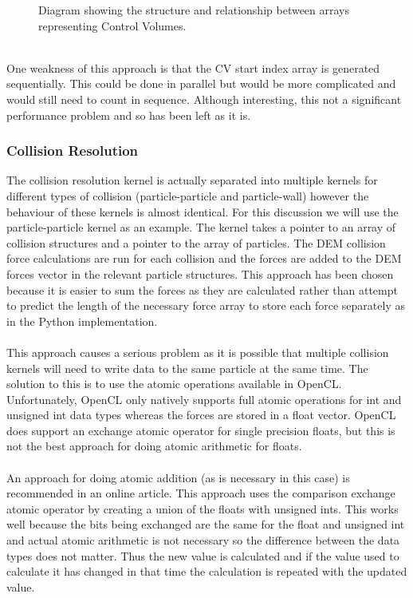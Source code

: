 \documentclass[a4paper,11pt,titlepage]{report}
\begin{document}
\begin{figure}[!ht]
\centering

\caption{Diagram showing the structure and relationship between arrays representing Control Volumes.}
\label{fig:cv_array_structure}
\end{figure}
\\One weakness of this approach is that the CV start index array is generated sequentially. This could be done in parallel but would be more complicated and would still need to count in sequence. Although interesting, this not a significant performance problem and so has been left as it is.
\subsubsection{Collision Resolution}
\label{sec:Collision Resolution}
The collision resolution kernel is actually separated into multiple kernels for different types of collision (particle-particle and particle-wall) however the behaviour of these kernels is almost identical. For this discussion we will use the particle-particle kernel as an example. The kernel takes a pointer to an array of collision structures and a pointer to the array of particles. The DEM collision force calculations are run for each collision and the forces are added to the DEM forces vector in the relevant particle structures. This approach has been chosen because it is easier to sum the forces as they are calculated rather than attempt to predict the length of the necessary force array to store each force separately as in the Python implementation.
\\\\This approach causes a serious problem as it is possible that multiple collision kernels will need to write data to the same particle at the same time. The solution to this is to use the atomic operations available in OpenCL. Unfortunately, OpenCL only natively supports full atomic operations for int and unsigned int data types whereas the forces are stored in a float vector. OpenCL does support an exchange atomic operator for single precision floats, but this is not the best approach for doing atomic arithmetic for floats.
\\\\An approach for doing atomic addition (as is necessary in this case) is recommended in an online article\cite{atomic_addition}. This approach uses the comparison exchange atomic operator by creating a union of the floats with unsigned ints. This works well because the bits being exchanged are the same for the float and unsigned int and actual atomic arithmetic is not necessary so the difference between the data types does not matter. Thus the new value is calculated and if the value used to calculate it has changed in that time the calculation is repeated with the updated value.
\end{document}

